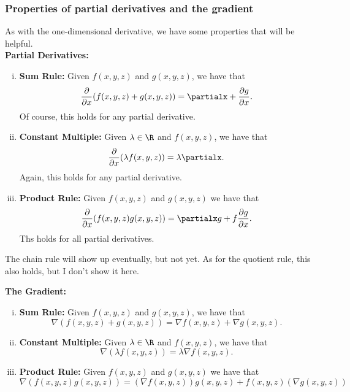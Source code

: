         \subsubsection{Properties of partial derivatives and the gradient}
        
        As with the one-dimensional derivative, we have some properties that will be helpful.\\
        
        \noindent\textbf{Partial Derivatives:}
        \begin{enumerate}[(i)]
            \item \textbf{Sum Rule:} Given $f(x,y,z)$ and $g(x,y,z)$, we have that
            \[
            \frac{\partial}{\partial x} (f(x,y,z)+g(x,y,z))=\partialx + \frac{\partial g}{\partial x}.
            \]
            Of course, this holds for any partial derivative.
            \item \textbf{Constant Multiple:} Given $\lambda \in \R$ and $f(x,y,z)$, we have that
            \[
            \frac{\partial}{\partial x}(\lambda f(x,y,z))=\lambda \partialx.
            \]
            Again, this holds for any partial derivative.
            \item \textbf{Product Rule:} Given $f(x,y,z)$ and $g(x,y,z)$ we have that
            \[
            \frac{\partial }{\partial x}(f(x,y,z)g(x,y,z))=\partialx g + f \frac{\partial g}{\partial x}.
            \]
            Ths holds for all partial derivatives.
        \end{enumerate}
        
        \begin{remark}
        The chain rule will show up eventually, but not yet.  As for the quotient rule, this also holds, but I don't show it here.
        \end{remark}
        
        \noindent\textbf{The Gradient:}
        \begin{enumerate}[(i)]
            \item \textbf{Sum Rule:} Given $f(x,y,z)$ and $g(x,y,z)$, we have that
            \[
            \nabla(f(x,y,z)+g(x,y,z))=\nabla f(x,y,z)+\nabla g(x,y,z).
            \]
            \item \textbf{Constant Multiple:} Given $\lambda \in \R$ and $f(x,y,z)$, we have that
            \[
            \nabla(\lambda f(x,y,z))=\lambda \nabla f(x,y,z).
            \]
            \item \textbf{Product Rule:} Given $f(x,y,z)$ and $g(x,y,z)$ we have that
            \[
            \nabla(f(x,y,z)g(x,y,z))=(\nabla f(x,y,z))g(x,y,z)+f(x,y,z)(\nabla g(x,y,z))
            \]
            
        \end{enumerate}
        
